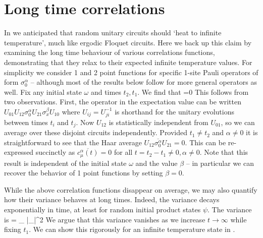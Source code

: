 \documentclass[aps,prb,twocolumn,superscriptaddress]{revtex4-1}
\begin{document}
\section{Long time correlations}\label{ss:longtimerandom}
In  we anticipated that random unitary circuits should `heat to infinite temperature', much like ergodic Floquet circuits. Here we back up this claim by examining the long time behaviour of various correlations functions, demonstrating that they relax to their expected infinite temperature values. For simplicity we consider 1 and 2 point functions for specific 1-site Pauli operators of form $\sigma_0^\alpha$ -- although most of the results below follow for more general operators as well. Fix any initial state $\omega$ and times $t_2 , t_1$. We find that
\be
{} =0
\ee
This follows from two observations. First, the operator in the expectation value can be written $U_{01} U_{12}\sigma_0^\alpha U_{21} \sigma_x^\beta U_{10}$ where $U_{ij} = U^{-1}_{ji}$ is shorthand for the unitary evolutions between times $t_i$ and $t_j$. Now $U_{12}$ is statistically independent from $U_{01}$, so we can average over these disjoint circuits independently. Provided $t_1 \neq t_2$ and $\alpha\neq 0$ it is straightforward to see that the Haar average $\overline{U_{12}\sigma_0^\alpha U_{21}}=0$. This can be re-expressed succinctly as $\overline{c^{\alpha}_{\mu}(t)}=0$ for all $t= t_2 - t_1\neq 0,\alpha \neq 0$. Note that this result is independent of the initial state $\omega$ and the value $\beta$ -- in particular we can recover the behavior of 1 point functions by setting $\beta=0$.  


While the above correlation functions disappear on average, we may also quantify how their variance behaves at long times. Indeed, the variance decays exponentially in time, at least for random initial product states $\psi$. The variance is  
\be
{} = \sum_{\mu}   |\rangle_\omega|^2
\ee
We argue that this variance vanishes as we increase $t\rightarrow\infty$ while fixing $t_1$. We can show this rigorously for an infinite temperature state in .
\end{document}
